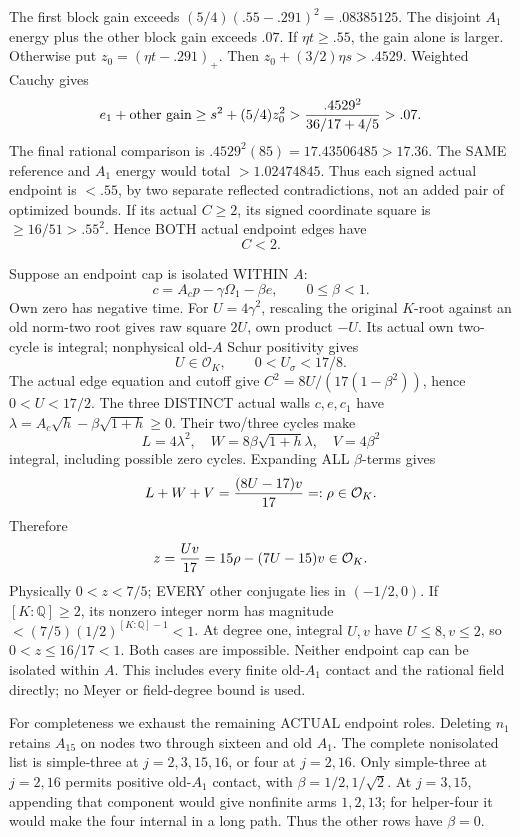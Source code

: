 The first block gain exceeds
\((5/4)(.55-.291)^2=.08385125\).
The disjoint \(A_1\) energy plus the other
block gain exceeds \(.07\).
If \(\eta t\ge.55\), the gain alone is
larger.
Otherwise put \(z_0=(\eta t-.291)_+\).
Then \(z_0+(3/2)\eta s>.4529\).
Weighted Cauchy gives
\[
 e_1+\text{other gain}\ge s^2+(5/4)z_0^2
       >{.4529^2\over36/17+4/5}>.07 .
\]
The final rational comparison is
\(.4529^2(85)=17.43506485>17.36\).
The SAME reference and \(A_1\) energy
would total \(>1.02474845\).
Thus each signed actual endpoint is
\(<.55\), by two separate reflected
contradictions, not an added pair of
optimized bounds.
If its actual \(C\ge2\), its signed
coordinate square is \(\ge16/51>.55^2\).
Hence BOTH actual endpoint edges have
\[
                                      C<2 .
\tag{A16r1C}\label{eq:arithA16rankonecutoff}
\]

Suppose an endpoint cap is isolated
WITHIN \(A\):
\[
 c=A_cp-\gamma\Omega_1-\beta e,\qquad0\le\beta<1 .
\]
Own zero has negative time.
For \(U=4\gamma^2\), rescaling the
original \(K\)-root against an old
norm-two root gives raw square \(2U\),
own product \(-U\).
Its actual own two-cycle is integral;
nonphysical old-\(A\) Schur positivity gives
\[
               U\in\mathcal O_K,\qquad0<U_\sigma<17/8 .
\]
The actual edge equation and cutoff give
\(C^2=8U/(17(1-\beta^2))\), hence \(0<U<17/2\).
The three DISTINCT actual walls \(c,e,c_1\)
have \(\lambda=A_c\sqrt h-\beta\sqrt{1+h}\ge0\).
Their two/three cycles make
\[
             L=4\lambda^2,\quad
             W=8\beta\sqrt{1+h}\lambda,\quad
             V=4\beta^2
\]
integral, including possible zero cycles.
Expanding ALL \(\beta\)-terms gives
\[
                  L+W+V={(8U-17)v\over17}=:\rho\in\mathcal O_K .
\]
Therefore
\[
                    z={Uv\over17}=15\rho-(7U-15)v
                                              \in\mathcal O_K .
\]
Physically \(0<z<7/5\); EVERY other
conjugate lies in \((-1/2,0)\).
If \([K:\mathbb Q]\ge2\), its nonzero
integer norm has magnitude
\(<(7/5)(1/2)^{[K:\mathbb Q]-1}<1\).
At degree one, integral \(U,v\) have
\(U\le8,v\le2\), so \(0<z\le16/17<1\).
Both cases are impossible.
Neither endpoint cap can be isolated
within \(A\).
This includes every finite old-\(A_1\)
contact and the rational field directly;
no Meyer or field-degree bound is used.

For completeness we exhaust the remaining
ACTUAL endpoint roles.
Deleting \(n_1\) retains \(A_{15}\)
on nodes two through sixteen and old
\(A_1\).
The complete nonisolated list is
simple-three at \(j=2,3,15,16\), or
four at \(j=2,16\).
Only simple-three at \(j=2,16\)
permits positive old-\(A_1\) contact,
with \(\beta=1/2,1/\sqrt2\).
At \(j=3,15\), appending that component
would give nonfinite arms \(1,2,13\);
for helper-four it would make the
four internal in a long path.
Thus the other rows have \(\beta=0\).

